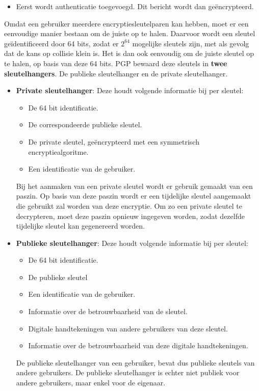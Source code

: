 \documentclass{report}
\begin{document}
	\begin{itemize}
		\item[\info] Eerst wordt authenticatie toegevoegd. Dit bericht wordt dan geëncrypteerd. 
	\end{itemize}
	Omdat een gebruiker meerdere encryptiesleutelparen kan hebben, moet er een eenvoudige manier bestaan om de juiste op te halen. Daarvoor wordt een sleutel geïdentificeerd door 64 bits, zodat er $2^{64}$ mogelijke sleutels zijn, met als gevolg dat de kans op collisie klein is. Het is dan ook eenvoudig om de juiste sleutel op te halen, op basis van deze 64 bits. PGP bewaard deze sleutels in \textbf{twee sleutelhangers}. De publieke sleutelhanger en de private sleutelhanger.
	\begin{itemize}
		\item[\info] \textbf{Private sleutelhanger}: Deze houdt volgende informatie bij per sleutel:
		\begin{itemize}
			\item De 64 bit identificatie.
			\item De correspondeerde publieke sleutel.
			\item De private sleutel, geëncrypteerd met een symmetrisch encryptiealgoritme.
			\item Een identificatie van de gebruiker.
		\end{itemize}

		Bij het aanmaken van een private sleutel wordt er gebruik gemaakt van een paszin. Op basis van deze paszin wordt er een tijdelijke sleutel aangemaakt die gebruikt zal worden van deze encryptie. Om zo een private sleutel te decrypteren, moet deze paszin opnieuw ingegeven worden, zodat dezelfde tijdelijke sleutel kan gegenereerd worden.

		\item[\info] \textbf{Publieke sleutelhanger}: Deze houdt volgende informatie bij per sleutel:
		\begin{itemize}
			\item De 64 bit identificatie.
			\item De publieke sleutel
			\item Een identificatie van de gebruiker.
			\item Informatie over de betrouwbaarheid van de sleutel.
			\item Digitale handtekeningen van andere gebruikers van deze sleutel.
			\item Informatie over de betrouwbaarheid van deze digitale handtekeningen.
		\end{itemize}

		De publieke sleutelhanger van een gebruiker, bevat dus publieke sleutels van andere gebruikers. De publieke sleutelhanger is echter niet publiek voor andere gebruikers, maar enkel voor de eigenaar.
	\end{itemize}
\end{document}
